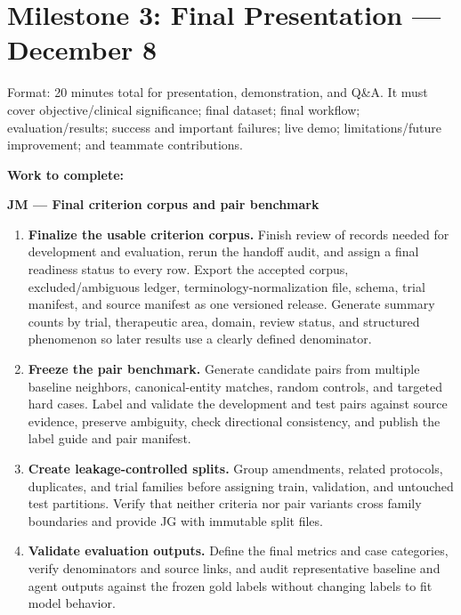 \documentclass[10pt]{article}
\begin{document}
\section{Milestone 3: Final Presentation --- December 8}
Format: 20 minutes total for presentation, demonstration, and Q\&A. It must cover objective/clinical significance; final dataset; final workflow; evaluation/results; success and important failures; live demo; limitations/future improvement; and teammate contributions.

\textbf{Work to complete:}

\textbf{JM --- Final criterion corpus and pair benchmark}
\begin{enumerate}
\item \textbf{Finalize the usable criterion corpus.} Finish review of records needed for development and evaluation, rerun the handoff audit, and assign a final readiness status to every row. Export the accepted corpus, excluded/ambiguous ledger, terminology-normalization file, schema, trial manifest, and source manifest as one versioned release. Generate summary counts by trial, therapeutic area, domain, review status, and structured phenomenon so later results use a clearly defined denominator.
\item \textbf{Freeze the pair benchmark.} Generate candidate pairs from multiple baseline neighbors, canonical-entity matches, random controls, and targeted hard cases. Label and validate the development and test pairs against source evidence, preserve ambiguity, check directional consistency, and publish the label guide and pair manifest.
\item \textbf{Create leakage-controlled splits.} Group amendments, related protocols, duplicates, and trial families before assigning train, validation, and untouched test partitions. Verify that neither criteria nor pair variants cross family boundaries and provide JG with immutable split files.
\item \textbf{Validate evaluation outputs.} Define the final metrics and case categories, verify denominators and source links, and audit representative baseline and agent outputs against the frozen gold labels without changing labels to fit model behavior.
\end{enumerate}
\end{document}
